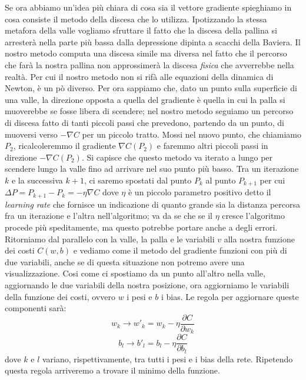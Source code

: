 Se ora abbiamo un'idea più chiara di cosa sia il vettore gradiente spieghiamo in cosa consiste il metodo della discesa che lo utilizza. Ipotizzando la stessa metafora della valle vogliamo sfruttare il fatto che la discesa della pallina si arresterà nella parte più bassa dalla depressione dipinta a scacchi della Baviera. Il nostro metodo computa una discesa simile ma diversa nel fatto che il percorso che farà la nostra pallina non approssimerà la discesa \textit{fisica} che avverrebbe nella realtà. Per cui il nostro metodo non si rifà alle equazioni della dinamica di Newton, è un pò diverso. Per ora sappiamo che, dato un punto sulla superficie di una valle, la direzione opposta a quella del gradiente è quella in cui la palla si muoverebbe se fosse libera di scendere; nel nostro metodo seguiamo un percorso di discesa fatto di tanti piccoli passi che prevedono, partendo da un punto, di muoversi verso $-\nabla C$ per un piccolo tratto. Mossi nel nuovo punto, che chiamiamo $P_{2}$, ricalcoleremmo il gradiente $\nabla C(P_{2})$ e faremmo altri piccoli passi in direzione $- \nabla C(P_{2})$. Si capisce che questo metodo va iterato a lungo per scendere lungo la valle fino ad arrivare nel suo punto più basso. Tra un iterazione $k$ e la successiva $k+1$, ci saremo spostati dal punto $P_{k}$ al punto $P_{k+1}$ per cui $ \Delta P= P_{k+1}-P_{k}=-\eta \nabla C$ dove $\eta$ è un piccolo parametro positivo detto il \textit{learning rate} che fornisce un indicazione di quanto grande sia la distanza percorsa fra un iterazione e l'altra nell'algoritmo; va da se che se il $\eta$ cresce l'algoritmo procede più speditamente, ma questo potrebbe portare anche a degli errori. Ritorniamo dal parallelo con la valle, la palla e le variabili $v$ alla nostra funzione dei costi $C(w, b)$ e vediamo come il metodo del gradiente funzioni con più di due variabili, anche se di questa situazione non potremo avere una visualizzazione. Cosi come ci spostiamo da un punto all'altro nella valle, aggiornando le due variabili della nostra posizione, ora aggiorniamo le variabili della funzione dei costi, ovvero $w$ i pesi e $b$ i bias. Le regola per aggiornare queste componenti sarà:
\begin{equation}
w_{k}\rightarrow w'_{k}=w_{k}-\eta \dfrac{\partial C}{\partial w_{k}}
\end{equation}
\begin{equation}
b_{l}\rightarrow b'_{l}=b_{l}-\eta \dfrac{\partial C}{\partial b_{l}}
\end{equation}
dove $k$ e $l$ variano, rispettivamente, tra tutti i pesi e i bias della rete. Ripetendo questa regola arriveremo a trovare il minimo della funzione.
